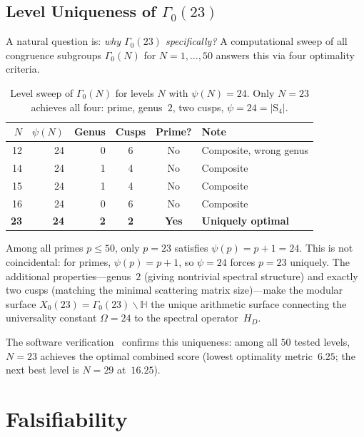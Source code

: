 \documentclass[11pt,a4paper]{article}
\theoremstyle{plain}
\theoremstyle{remark}
\renewcommand{\Omega}{\varOmega}
\begin{document}
\subsection{Level Uniqueness of $\Gamma_0(23)$}
\label{sec:level-uniqueness}

A natural question is: \emph{why $\Gamma_0(23)$ specifically?}  A
computational sweep of all congruence subgroups $\Gamma_0(N)$ for
$N=1,\ldots,50$ answers this via four optimality criteria.

\begin{table}[H]
\centering\small
\caption{Level sweep of $\Gamma_0(N)$ for levels $N$ with
$\psi(N)=24$.  Only $N=23$ achieves all four: prime, genus~$2$,
two cusps, $\psi=24=|\mathrm{S}_4|$.}
\label{tab:level-sweep}
\begin{tabular}{@{}rrrccl@{}}
\toprule
$N$ & $\psi(N)$ & Genus & Cusps & Prime? & Note\\
\midrule
12 & 24 & 0 & 6 & No & Composite, wrong genus\\
14 & 24 & 1 & 4 & No & Composite\\
15 & 24 & 1 & 4 & No & Composite\\
16 & 24 & 0 & 6 & No & Composite\\
\rowcolor{yellow!20}
\textbf{23} & \textbf{24} & \textbf{2} & \textbf{2} & \textbf{Yes}
  & \textbf{Uniquely optimal}\\
\bottomrule
\end{tabular}
\end{table}

Among all primes $p\leq 50$, only $p=23$ satisfies $\psi(p)=p+1=24$.
This is not coincidental: for primes, $\psi(p)=p+1$, so $\psi=24$
forces $p=23$ uniquely.  The additional properties---genus~$2$ (giving
nontrivial spectral structure) and exactly two cusps (matching the
minimal scattering matrix size)---make the modular surface
$X_0(23)=\Gamma_0(23)\backslash\mathbb{H}$ the unique arithmetic
surface connecting the universality constant $\Omega=24$ to the
spectral operator~$H_D$.

The software verification~\cite{isomorphic-engine2026} confirms this
uniqueness: among all $50$ tested levels, $N=23$ achieves the optimal
combined score (lowest optimality metric~$6.25$; the next best level
is $N=29$ at~$16.25$).

\section{Falsifiability}
\label{sec:falsifiability}
\end{document}
